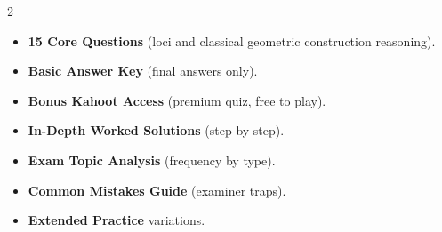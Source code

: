 \documentclass[11pt,a4paper]{article}
\newcommand{\FullReleaseDate}{April 30, 2026}
\begin{document}
\vspace{8pt}

\begin{multicols}{2}
  \begin{tcolorbox}[card, title=\sffamily\bfseries\textcolor{white}{\faHandPointDown\ TODAY (Simplified Version)}, colbacktitle=mainblue, boxed title style={sharp corners, boxrule=0pt}]
    \begin{itemize}[leftmargin=1.2em, itemsep=2pt]
      \item \small \textbf{15 Core Questions} (loci and classical geometric construction reasoning).
      \item \small \textbf{Basic Answer Key} (final answers only).
      \item \small \textbf{Bonus Kahoot Access} (premium quiz, free to play).
    \end{itemize}
  \end{tcolorbox}

  \columnbreak

  \begin{tcolorbox}[card, title=\sffamily\bfseries\textcolor{white}{\faRocket\ ON \FullReleaseDate\ (Full Upgrade)}, colbacktitle=mainblue, boxed title style={sharp corners, boxrule=0pt}]
    \begin{itemize}[leftmargin=1.2em, itemsep=2pt]
      \item \small \textbf{In-Depth Worked Solutions} (step-by-step).
      \item \small \textbf{Exam Topic Analysis} (frequency by type).
      \item \small \textbf{Common Mistakes Guide} (examiner traps).
      \item \small \textbf{Extended Practice} variations.
    \end{itemize}
  \end{tcolorbox}
\end{multicols}
\end{document}
